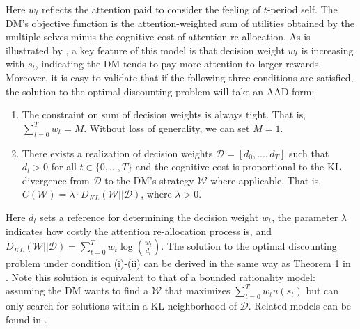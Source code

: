 \documentclass[
  12pt,
]{article}
\begin{document}
Here \(w_t\) reflects the attention paid to consider the feeling of
\(t\)-period self. The DM's objective function is the attention-weighted
sum of utilities obtained by the multiple selves minus the cognitive
cost of attention re-allocation. As is illustrated by
\citet{noor2022optimal,noor2024constrained}, a key feature of this model
is that decision weight \(w_t\) is increasing with \(s_t\), indicating
the DM tends to pay more attention to larger rewards. Moreover, it is
easy to validate that if the following three conditions are satisfied,
the solution to the optimal discounting problem will take an AAD form:

\begin{enumerate}
\def\labelenumi{(\roman{enumi})}
\item
  The constraint on sum of decision weights is always tight. That is,
  \(\sum_{t=0}^Tw_t=M\). Without loss of generality, we can set \(M=1\).
\item
  There exists a realization of decision weights
  \(\mathcal{D}=[d_0,...,d_T]\) such that \(d_t>0\) for all
  \(t\in\{0,…,T\}\) and the cognitive cost is proportional to the KL
  divergence from \(\mathcal{D}\) to the DM's strategy \(\mathcal{W}\)
  where applicable. That is,
  \(C(\mathcal{W})= \lambda\cdot D_{KL}(\mathcal{W}||\mathcal{D})\),
  where \(\lambda>0\).
\end{enumerate}

Here \(d_t\) sets a reference for determining the decision weight
\(w_t\), the parameter \(\lambda\) indicates how costly the attention
re-allocation process is, and
\(D_{KL}(\mathcal{W}||\mathcal{D})=\sum_{t=0}^Tw_t\log(\frac{w_t}{d_t})\).
The solution to the optimal discounting problem under condition (i)-(ii)
can be derived in the same way as Theorem 1 in
\citet{matvejka2015rational}. Note this solution is equivalent to that
of a bounded rationality model: assuming the DM wants to find a
\(\mathcal{W}\) that maximizes \(\sum_{t=0}^Tw_tu(s_t)\) but can only
search for solutions within a KL neighborhood of \(\mathcal{D}\).
Related models can be found in \citet{todorov2009efficient}.
\end{document}
